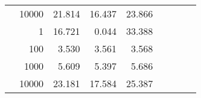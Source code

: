 \begin{table}
\begin{tabular}{rrrrrrrrr}
	            
					 &  
					 
					\multirow{ 1 }{*}{ 10000 } &
					
						
							    
							    
	                           21.814 & 16.437 & 23.866  \\
	                
	            
	        
				\noalign{\smallskip}\hline
				\multirow{ 4 }{*}{ 2000000 } &
				
					
					 
					\multirow{ 1 }{*}{ 1 } &
					
						
							    
							    
	                           16.721 & 0.044 & 33.388  \\
	                
	            
					 &  
					 
					\multirow{ 1 }{*}{ 100 } &
					
						
							    
							    
	                           3.530 & 3.561 & 3.568  \\
	                
	            
					 &  
					 
					\multirow{ 1 }{*}{ 1000 } &
					
						
							    
							    
	                           5.609 & 5.397 & 5.686  \\
	                
	            
					 &  
					 
					\multirow{ 1 }{*}{ 10000 } &
					
						
							    
							    
	                           23.181 & 17.584 & 25.387  \\
	                
	            
	        

\hline

\end{tabular}
\end{table}
\clearpage


	    

